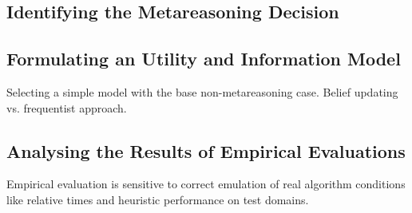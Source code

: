 \subsection{Identifying the Metareasoning Decision}


\subsection{Formulating an Utility and Information Model}

Selecting a simple model with the base non-metareasoning case.
Belief updating vs. frequentist approach.

\subsection{Analysing the Results of Empirical Evaluations}

Empirical evaluation is sensitive to correct emulation of real
algorithm conditions like relative times and heuristic performance
on test domains.

